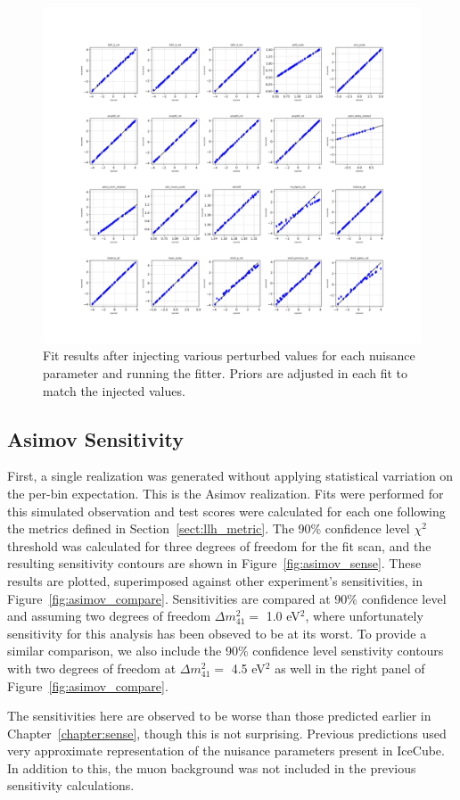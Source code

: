 \documentclass[main.tex]{subfiles}
\begin{document}
\begin{figure}
    \centering 
    \includegraphics[width=0.7\linewidth]{figures/inject_recover_syst_prior.png}
    \caption{Fit results after injecting various perturbed values for each nuisance parameter and running the fitter. Priors are adjusted in each fit to match the injected values.}\label{fig:ir_priorpert}
\end{figure}

\subsection{Asimov Sensitivity}

First, a single realization was generated without applying statistical varriation on the per-bin expectation. 
This is the Asimov realization. 
Fits were performed for this simulated observation and test scores were calculated for each one following the metrics defined in Section~\ref{sect:llh_metric}.
The 90\% confidence level $\chi^{2}$ threshold was calculated for three degrees of freedom for the fit scan, and the resulting sensitivity contours are shown in Figure~\ref{fig:asimov_sense}. 
These results are plotted, superimposed against other experiment's sensitivities, in Figure~\ref{fig:asimov_compare}. 
Sensitivities are compared at 90\% confidence level and assuming two degrees of freedom $\Delta m_{41}^{2}=$ 1.0 eV$^{2}$, where unfortunately sensitivity for this analysis has been obseved to be at its worst. 
To provide a similar comparison, we also include the 90\% confidence level senstivity contours with two degrees of freedom at $\Delta m_{41}^{2}=$ 4.5 eV$^{2}$ as well in the right panel of Figure~\ref{fig:asimov_compare}.

The sensitivities here are observed to be worse than those predicted earlier in Chapter~\ref{chapter:sense}, though this is not surprising. 
Previous predictions used very approximate representation of the nuisance parameters present in IceCube. 
In addition to this, the muon background was not included in the previous sensitivity calculations.
\end{document}
